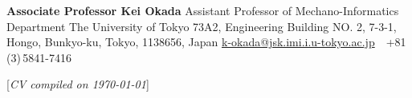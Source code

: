\documentclass[letterpaper,MMMyyyy,nonstop]{simpleresumecv}
\newcommand{\CVNote}{CV compiled on {\today}}
\begin{document}
\begin{body}
\BigGap
\BulletItem
\textbf{Associate Professor Kei Okada}
\newline
Assistant Professor of Mechano-Informatics Department
\newline
The University of Tokyo
\newline
73A2, Engineering Building NO. 2, 7-3-1, Hongo, Bunkyo-ku, Tokyo, 1138656, Japan
\newline
\href{mailto:k-okada@jsk.imi.i.u-tokyo.ac.jp}
{k-okada@jsk.imi.i.u-tokyo.ac.jp}
\,\SubBulletSymbol\,
+81\,(3)\,5841-7416

\end{body}


\UseNoteFont%
\null\hfill%
[\textit{\CVNote}]%
\hspace{2.0mm}\null
\end{document}
